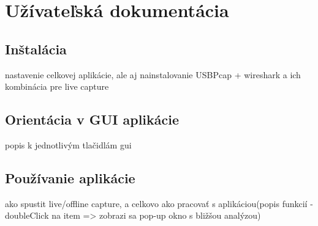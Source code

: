 \chapter{Užívateľská dokumentácia}
\section{Inštalácia}
nastavenie celkovej aplikácie, ale aj nainstalovanie USBPcap + wireshark a ich kombinácia pre live capture
\section{Orientácia v GUI aplikácie}
popis k jednotlivým tlačidlám gui
\section{Používanie aplikácie}
ako spustit live/offline capture, a celkovo ako pracovať s aplikáciou(popis funkcií - doubleClick na item => zobrazi sa pop-up okno s bližšou analýzou)



